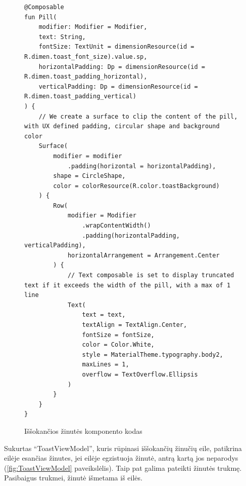 \begin{figure}[htbp!]
    \centering
    \begin{verbatim}
@Composable
fun Pill(
    modifier: Modifier = Modifier,
    text: String,
    fontSize: TextUnit = dimensionResource(id = R.dimen.toast_font_size).value.sp,
    horizontalPadding: Dp = dimensionResource(id = R.dimen.toast_padding_horizontal),
    verticalPadding: Dp = dimensionResource(id = R.dimen.toast_padding_vertical)
) {
    // We create a surface to clip the content of the pill, with UX defined padding, circular shape and background color
    Surface(
        modifier = modifier
            .padding(horizontal = horizontalPadding),
        shape = CircleShape,
        color = colorResource(R.color.toastBackground)
    ) {
        Row(
            modifier = Modifier
                .wrapContentWidth()
                .padding(horizontalPadding, verticalPadding),
            horizontalArrangement = Arrangement.Center
        ) {
            // Text composable is set to display truncated text if it exceeds the width of the pill, with a max of 1 line
            Text(
                text = text,
                textAlign = TextAlign.Center,
                fontSize = fontSize,
                color = Color.White,
                style = MaterialTheme.typography.body2,
                maxLines = 1,
                overflow = TextOverflow.Ellipsis
            )
        }
    }
}
    \end{verbatim}
    \caption{Iššokančios žinutės komponento kodas}
    \label{fig:pillCode}
\end{figure}
\newpage
Sukurtas \enquote{ToastViewModel}, kuris rūpinasi iššokančių žinučių eile, patikrina eilėje esančias žinutes, jei eilėje egzistuoja žinutė, antrą kartą jos neparodys (\ref{fig:ToastViewModel} paveikslėlis). Taip pat galima pateikti žinutės trukmę. Pasibaigus trukmei, žinutė išmetama iš eilės.

